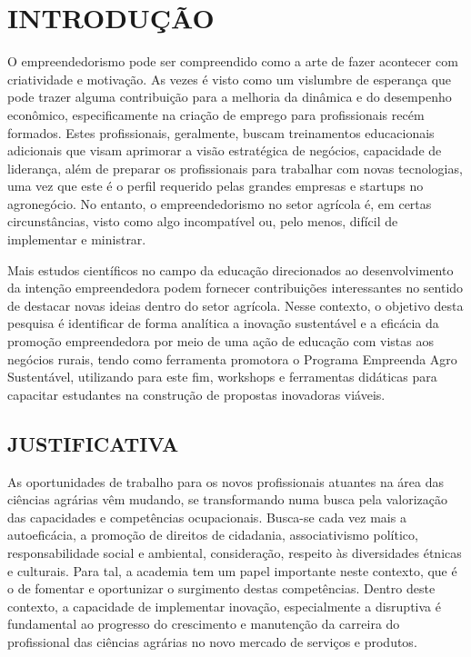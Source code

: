 \chapter{INTRODUÇÃO}

O empreendedorismo  pode ser compreendido como a arte de fazer acontecer com criatividade e motivação. As vezes é visto como um vislumbre de esperança que pode trazer alguma contribuição para a melhoria da dinâmica e do desempenho econômico, especificamente na criação de emprego para profissionais recém formados. Estes profissionais, geralmente, buscam treinamentos educacionais adicionais que visam aprimorar a visão estratégica de negócios, capacidade de liderança, além de preparar os profissionais para trabalhar com novas tecnologias, uma vez que este é o perfil requerido pelas grandes empresas e startups no agronegócio. No entanto, o empreendedorismo no setor agrícola é, em certas circunstâncias, visto como algo incompatível ou, pelo menos, difícil de implementar e ministrar.

Mais estudos científicos no campo da educação direcionados ao desenvolvimento da intenção empreendedora  podem fornecer contribuições interessantes no sentido de destacar novas ideias dentro do setor agrícola. Nesse contexto, o  objetivo desta pesquisa é identificar de forma analítica a inovação sustentável e a eficácia da promoção empreendedora por meio de uma ação de educação com vistas aos negócios rurais, tendo como ferramenta promotora o Programa Empreenda Agro Sustentável, utilizando para este fim, workshops e ferramentas didáticas para capacitar estudantes na construção de propostas inovadoras viáveis.



\section{JUSTIFICATIVA}

As oportunidades de trabalho para os novos profissionais atuantes na área das ciências agrárias vêm mudando, se transformando numa busca pela valorização das capacidades e competências ocupacionais. Busca-se cada vez mais a autoeficácia, a promoção de direitos de cidadania, associativismo político, responsabilidade social e ambiental, consideração, respeito às diversidades étnicas e culturais. Para tal, a academia tem um papel importante neste contexto, que é o de fomentar e oportunizar o surgimento destas competências. Dentro deste contexto, a capacidade de implementar inovação, especialmente a disruptiva é fundamental ao progresso do crescimento e manutenção da carreira do profissional das ciências agrárias no novo mercado de serviços e produtos. 


